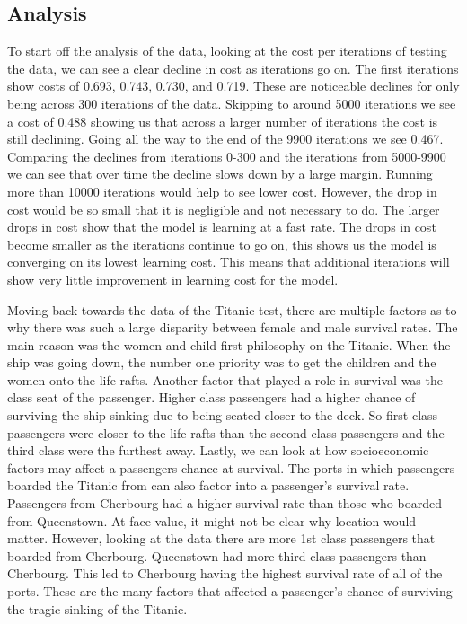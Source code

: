 \documentclass{IEEE}
\begin{document}
\subsection{Analysis}

To start off the analysis of the data, looking at the cost per iterations of testing the data, we can see a clear decline in cost as iterations go on. The first iterations show costs of 0.693, 0.743, 0.730, and 0.719. These are noticeable declines for only being across 300 iterations of the data. Skipping to around 5000 iterations we see a cost of 0.488 showing us that across a larger number of iterations the cost is still declining. Going all the way to the end of the 9900 iterations we see 0.467. Comparing the declines from iterations 0-300 and the iterations from 5000-9900 we can see that over time the decline slows down by a large margin. Running more than 10000 iterations would help to see lower cost. However, the drop in cost would be so small that it is negligible and not necessary to do. The larger drops in cost show that the model is learning at a fast rate. The drops in cost become smaller as the iterations continue to go on, this shows us the model is converging on its lowest learning cost. This means that additional iterations will show very little improvement in learning cost for the model.

Moving back towards the data of the Titanic test, there are multiple factors as to why there was such a large disparity between female and male survival rates. The main reason was the women and child first philosophy on the Titanic. When the ship was going down, the number one priority was to get the children and the women onto the life rafts. Another factor that played a role in survival was the class seat of the passenger. Higher class passengers had a higher chance of surviving the ship sinking due to being seated closer to the deck. So first class passengers were closer to the life rafts than the second class passengers and the third class were the furthest away. Lastly, we can look at how socioeconomic factors may affect a passengers chance at survival. The ports in which passengers boarded the Titanic from can also factor into a passenger’s survival rate. Passengers from Cherbourg had a higher survival rate than those who boarded from Queenstown. At face value, it might not be clear why location would matter. However, looking at the data there are more 1st class passengers that boarded from Cherbourg. Queenstown had more third class passengers than Cherbourg. This led to Cherbourg having the highest survival rate of all of the ports. These are the many factors that affected a passenger’s chance of surviving the tragic sinking of the Titanic.
\end{document}
